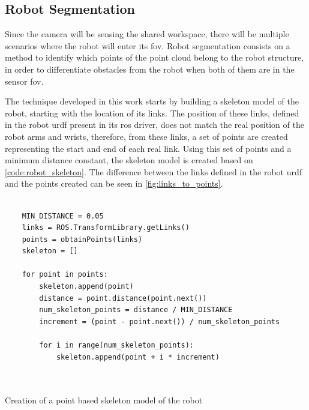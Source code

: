 


\subsection{Robot Segmentation}

\par Since the camera will be sensing the shared workspace, there will be multiple scenarios where the robot will enter its \ac{fov}. Robot segmentation consists on a method to identify which points of the point cloud belong to the robot structure, in order to differentiate obstacles from the robot when both of them are in the sensor \ac{fov}.

\par The technique developed in this work starts by building a skeleton model of the robot, starting with the location of its links. The position of these links, defined in the robot \ac{urdf} present in its \ac{ros} driver, does not match the real position of the robot arms and wrists, therefore, from these links, a set of points are created representing the start and end of each real link. Using this set of points and a minimum distance constant, the skeleton model is created based on \autoref{code:robot_skeleton}. The difference between the links defined in the robot \ac{urdf} and the points created can be seen in \autoref{fig:links_to_points}.


\begin{listing}[h]
    \centering
    \begin{verbatim}

    MIN_DISTANCE = 0.05
    links = ROS.TransformLibrary.getLinks()
    points = obtainPoints(links)
    skeleton = []

    for point in points:  
        skeleton.append(point)
        distance = point.distance(point.next())
        num_skeleton_points = distance / MIN_DISTANCE
        increment = (point - point.next()) / num_skeleton_points

        for i in range(num_skeleton_points):
            skeleton.append(point + i * increment)

    
    \end{verbatim}
\caption{Creation of a point based skeleton model of the robot}
\label{code:robot_skeleton}
\end{listing}


